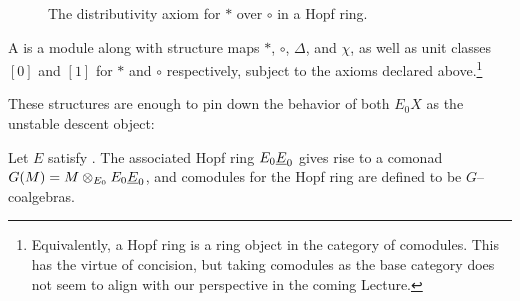 \begin{figure}
\begin{center}
\end{center}
\caption{The distributivity axiom for \(\ast\) over \(\circ\) in a Hopf ring.}\label{DistributivityDiagram}
\end{figure}

\begin{definition}
A  is a module along with structure maps \(\ast\), \(\circ\), \(\Delta\), and \(\chi\), as well as unit classes \([0]\) and \([1]\) for \(\ast\) and \(\circ\) respectively, subject to the axioms declared above.\footnote{Equivalently, a Hopf ring is a ring object in the category of comodules.  This has the virtue of concision, but taking comodules as the base category does not seem to align with our perspective in the coming Lecture.}
\end{definition}

These structures are enough to pin down the behavior of both \(E_0 X\) as the unstable descent object:

\begin{definition}
Let \(E\) satisfy {\UFH}.  The associated Hopf ring \(E_0 \underline{\smash{E}}_{0}\) gives rise to a comonad \(G(M) = M \otimes_{E_0} E_0 \underline{\smash{E}}_{0}\), and comodules for the Hopf ring are defined to be \(G\)--coalgebras.
\end{definition}

